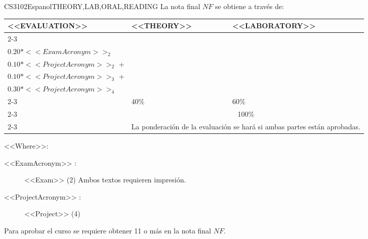   \begin{evaluation}{CS3102}{Espanol}{THEORY,LAB,ORAL,READING}
  La nota final $NF$ se obtiene a través de: 

  \begin{tabularx}{0.9\textwidth}{|X|p{}|p{}|} \hline
  \multirow{4}{*}{\uppercase{<<Evaluation>>}} & \uppercase{<<Theory>>} & \uppercase{<<Laboratory>>} \\ \cline{2-3}
  & %
      \begin{minipage}{0.95\textwidth}
      \begin{tabular}{l}
        $0.20*<<ExamAcronym>>_{1}$  + \\
        $0.20*<<ExamAcronym>>_{2}$ 
      \end{tabular} 
      \end{minipage} 
  & %
      \begin{minipage}{0.95\textwidth}
      \begin{tabular}{l}
        $0.10*<<ProjectAcronym>>_{1}$  + \\
        $0.10*<<ProjectAcronym>>_{2}$  + \\
        $0.10*<<ProjectAcronym>>_{3}$  + \\
        $0.30*<<ProjectAcronym>>_{4}$
      \end{tabular} 
      \end{minipage}                 \\ \cline{2-3}
  
  & %
  40\% 
  & %
  60\% \\ \cline{2-3}
  & \multicolumn{2}{|c|}{100\%}  \\ \cline{2-3}
  & \multicolumn{2}{|c|}{La ponderación de la evaluación se hará si ambas partes están aprobadas.}  \\ \hline
  \end{tabularx}
    
  \vspace{2mm}
  \noindent <<Where>>:
  \begin{description}
      \item[<<ExamAcronym>> :] <<Exam>> (2) Ambos textos requieren impresión.
      \item[<<ProjectAcronym>> :] <<Project>> (4)
  \end{description}

  \noindent Para aprobar el curso se requiere obtener 11 o más en la nota final $NF$.
  \end{evaluation}


